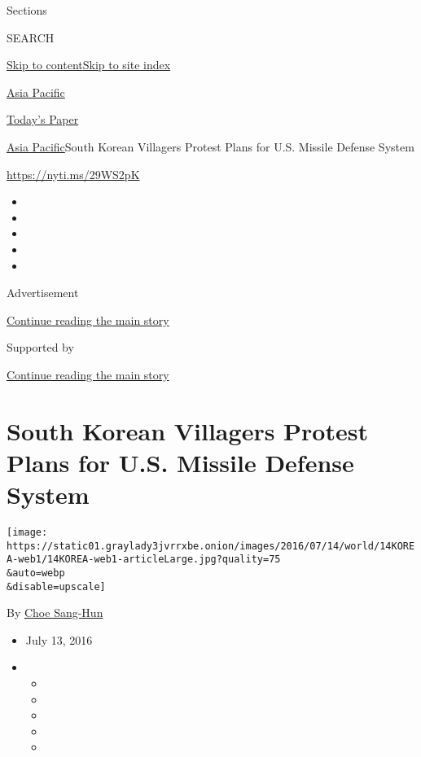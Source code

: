 Sections

SEARCH

\protect\hyperlink{site-content}{Skip to
content}\protect\hyperlink{site-index}{Skip to site index}

\href{https://www.nytimes3xbfgragh.onion/section/world/asia}{Asia
Pacific}

\href{https://myaccount.nytimes3xbfgragh.onion/auth/login?response_type=cookie\&client_id=vi}{}

\href{https://www.nytimes3xbfgragh.onion/section/todayspaper}{Today's
Paper}

\href{/section/world/asia}{Asia Pacific}\textbar{}South Korean Villagers
Protest Plans for U.S. Missile Defense System

\url{https://nyti.ms/29WS2pK}

\begin{itemize}
\item
\item
\item
\item
\item
\end{itemize}

Advertisement

\protect\hyperlink{after-top}{Continue reading the main story}

Supported by

\protect\hyperlink{after-sponsor}{Continue reading the main story}

\hypertarget{south-korean-villagers-protest-plans-for-us-missile-defense-system}{%
\section{South Korean Villagers Protest Plans for U.S. Missile Defense
System}\label{south-korean-villagers-protest-plans-for-us-missile-defense-system}}

\texttt{[image: https://static01.graylady3jvrrxbe.onion/images/2016/07/14/world/14KOREA-web1/14KOREA-web1-articleLarge.jpg?quality=75\\\&auto=webp\\\&disable=upscale]}

By \href{http://www.nytimes3xbfgragh.onion/by/choe-sang-hun}{Choe
Sang-Hun}

\begin{itemize}
\item
  July 13, 2016
\item
  \begin{itemize}
  \item
  \item
  \item
  \item
  \item
  \end{itemize}
\end{itemize}

